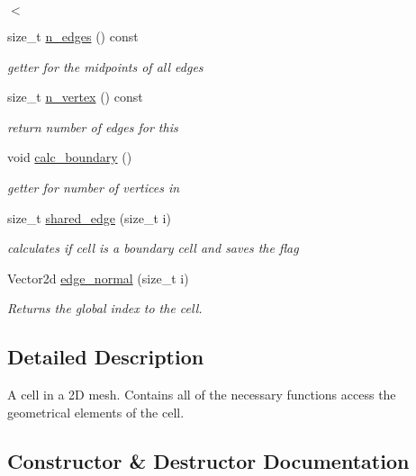 \begin{DoxyCompactItemize}
\begin{DoxyCompactList}\small\item\em $<$ \end{DoxyCompactList}\item 
size\+\_\+t \hyperlink{classMeshFramework2D_1_1Cell2D_a3513683b24ddb93f97f4f177649d9009}{n\+\_\+edges} () const
\begin{DoxyCompactList}\small\item\em getter for the midpoints of all edges \end{DoxyCompactList}\item 
size\+\_\+t \hyperlink{classMeshFramework2D_1_1Cell2D_aafd7dfeecdd6db6e66cace7fa685ec58}{n\+\_\+vertex} () const
\begin{DoxyCompactList}\small\item\em return number of edges for this \end{DoxyCompactList}\item 
void \hyperlink{classMeshFramework2D_1_1Cell2D_a45e79a174895ad2282ecf4f70deb1ac2}{calc\+\_\+boundary} ()
\begin{DoxyCompactList}\small\item\em getter for number of vertices in \end{DoxyCompactList}\item 
size\+\_\+t \hyperlink{classMeshFramework2D_1_1Cell2D_a7ec95ac9c1ef2551f6ca2a4b2078ee40}{shared\+\_\+edge} (size\+\_\+t i)
\begin{DoxyCompactList}\small\item\em calculates if cell is a boundary cell and saves the flag \end{DoxyCompactList}\item 
Vector2d \hyperlink{classMeshFramework2D_1_1Cell2D_a50635f2a486a9af7aa89d6af4dc17422}{edge\+\_\+normal} (size\+\_\+t i)
\begin{DoxyCompactList}\small\item\em Returns the global index to the cell. \end{DoxyCompactList}\end{DoxyCompactItemize}


\subsection{Detailed Description}
A cell in a 2D mesh. Contains all of the necessary functions access the geometrical elements of the cell. 

\subsection{Constructor \& Destructor Documentation}
\mbox{\label{classMeshFramework2D_1_1Cell2D_a2809b2187df931c08882188899a365ae}} 
